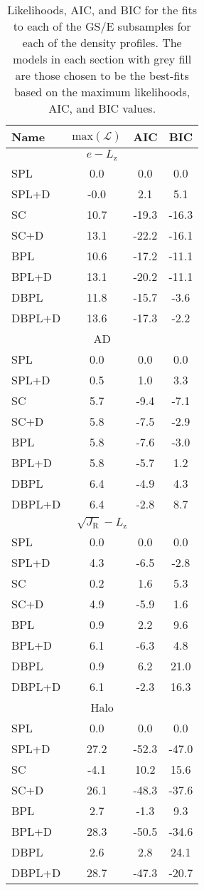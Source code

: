 \begin{table}
\centering
\small
\caption{Likelihoods, AIC, and BIC for the fits to each of the GS/E subsamples for each of the density profiles. The models in each section with grey fill are those chosen to be the best-fits based on the maximum likelihoods, AIC, and BIC values.}
\label{tab:likelihood}
\begin{tabular}{lccc}

\hline 
Name & $\mathrm{max}(\mathcal{L})$ & AIC & BIC \\ 
\hline 
\multicolumn{4}{c}{$e-L_\mathrm{z}$} \\ 
\hline 
SPL & 0.0 & 0.0 & 0.0 \\ 
SPL+D & -0.0 & 2.1 & 5.1 \\ 
SC & 10.7 & -19.3 & -16.3 \\ 
\rowcolor{lightgray} SC+D & 13.1 & -22.2 & -16.1 \\ 
BPL & 10.6 & -17.2 & -11.1 \\ 
BPL+D & 13.1 & -20.2 & -11.1 \\ 
DBPL & 11.8 & -15.7 & -3.6 \\ 
DBPL+D & 13.6 & -17.3 & -2.2 \\ 
\hline 
\multicolumn{4}{c}{AD} \\ 
\hline 
SPL & 0.0 & 0.0 & 0.0 \\ 
SPL+D & 0.5 & 1.0 & 3.3 \\ 
\rowcolor{lightgray} SC & 5.7 & -9.4 & -7.1 \\ 
SC+D & 5.8 & -7.5 & -2.9 \\ 
BPL & 5.8 & -7.6 & -3.0 \\ 
BPL+D & 5.8 & -5.7 & 1.2 \\ 
DBPL & 6.4 & -4.9 & 4.3 \\ 
DBPL+D & 6.4 & -2.8 & 8.7 \\ 
\hline 
\multicolumn{4}{c}{$\sqrt{J_\mathrm{R}}-L_\mathrm{z}$} \\ 
\hline 
SPL & 0.0 & 0.0 & 0.0 \\ 
\rowcolor{lightgray} SPL+D & 4.3 & -6.5 & -2.8 \\ 
SC & 0.2 & 1.6 & 5.3 \\ 
SC+D & 4.9 & -5.9 & 1.6 \\ 
BPL & 0.9 & 2.2 & 9.6 \\ 
BPL+D & 6.1 & -6.3 & 4.8 \\ 
DBPL & 0.9 & 6.2 & 21.0 \\ 
DBPL+D & 6.1 & -2.3 & 16.3 \\ 
\hline 
\multicolumn{4}{c}{Halo} \\ 
\hline 
SPL & 0.0 & 0.0 & 0.0 \\ 
\rowcolor{lightgray} SPL+D & 27.2 & -52.3 & -47.0 \\ 
SC & -4.1 & 10.2 & 15.6 \\ 
SC+D & 26.1 & -48.3 & -37.6 \\ 
BPL & 2.7 & -1.3 & 9.3 \\ 
BPL+D & 28.3 & -50.5 & -34.6 \\ 
DBPL & 2.6 & 2.8 & 24.1 \\ 
DBPL+D & 28.7 & -47.3 & -20.7 \\ 
\hline 




\end{tabular}
\end{table}
